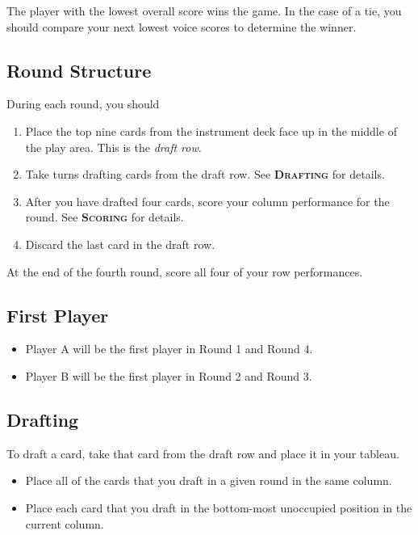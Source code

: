 \documentclass[a6paper, 12pt, parskip=half, DIV=14]{scrartcl}
\begin{document}
The player with the lowest overall score wins the game. In the case of a tie, you should compare your next lowest voice scores to determine the winner. 

\newpage
\enlargethispage{1.75\baselineskip}
\subsection*{Round Structure}
During each round, you should
\begin{enumerate}[leftmargin=4ex]
\item Place the top nine cards from the instrument deck face up in the middle of the play area. This is the \emph{draft row}.

\item Take turns drafting cards from the draft row. See \textcolor{redfabric}{\textbf{\scshape{Drafting}}} for details.

\item After you have drafted four cards, score your column performance for the round. See \textcolor{redfabric}{\textbf{\scshape{Scoring}}} for details.

\item Discard the last card in the draft row.
\end{enumerate}

At the end of the fourth round, score all four of your row performances.

\subsection*{First Player}
\begin{itemize}[leftmargin=4ex]
\item Player A will be the first player in Round 1 and Round 4.
\item Player B will be the first player in Round 2 and Round 3.
\end{itemize}

\newpage
\enlargethispage{1.75\baselineskip}
\subsection*{Drafting}
To draft a card, take that card from the draft row and place it in your tableau.
\begin{itemize}[leftmargin=4ex]
\item Place all of the cards that you draft in a given round in the same column.
\item Place each card that you draft in the bottom-most unoccupied position in the current column.
\end{itemize}
\end{document}
